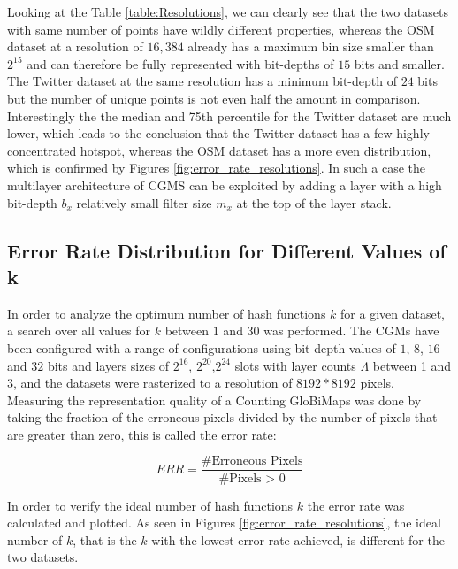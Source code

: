 \documentclass[sigconf, nonacm]{acmart}
\begin{document}
Looking at the Table \ref{table:Resolutions}, we can clearly see that the two datasets with same number of points have wildly different properties, whereas the OSM dataset at a resolution of $16,384$ already has a maximum bin size smaller than $2^{15}$ and can therefore be fully represented with bit-depths of $15$ bits and smaller. The Twitter dataset at the same resolution has a minimum bit-depth of $24$ bits but the number of unique points is not even half the amount in comparison. Interestingly the the median and 75th percentile for the Twitter dataset are much lower, which leads to the conclusion that the Twitter dataset has a few highly concentrated hotspot, whereas the OSM dataset has a more even distribution, which is confirmed by Figures \ref{fig:error_rate_resolutions}. In such a case the multilayer architecture of CGMS can be exploited by adding a layer with a high bit-depth $b_x$ relatively small filter size $m_x$ at the top of the layer stack.


\subsection{Error Rate Distribution for Different Values of k}
\label{error-rate-distribution-for-different-values-of-k}
In order to analyze the optimum number of hash functions $k$ for a given dataset, a search over all values for $k$ between $1$ and $30$ was performed.
The CGMs have been configured with a range of configurations using bit-depth values of $1$, $8$, $16$ and $32$ bits and layers sizes of $2^{16}$, $2^{20}$,$2^{24}$ slots with layer counts $\Lambda$ between 1 and 3, and the datasets were rasterized to a resolution of $8192*8192$ pixels.
Measuring the representation quality of a Counting GloBiMaps was done by taking the fraction of the erroneous pixels divided by the number of pixels that are greater than zero, this is called the error rate:

$$ERR = \frac{\text{\# Erroneous Pixels}}{\text{\# Pixels > 0}}$$

In order to verify the ideal number of hash functions $k$ the error rate was calculated and plotted.
As seen in Figures \ref{fig:error_rate_resolutions}, the ideal number of $k$, that is the $k$ with the lowest error rate achieved, is different for the two datasets.
%
%
\end{document}
